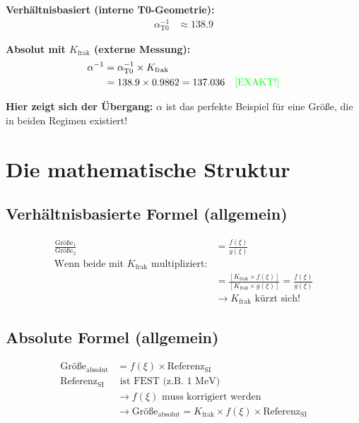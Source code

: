 \documentclass[12pt,a4paper]{article}
\begin{document}
	\textbf{Verhältnisbasiert (interne T0-Geometrie):}
	\begin{align*}
		\alpha_{\text{T0}}^{-1} &\approx 138.9
	\end{align*}
	
	\textbf{Absolut mit $K_{\text{frak}}$ (externe Messung):}
	\begin{align*}
		\alpha^{-1} &= \alpha_{\text{T0}}^{-1} \times K_{\text{frak}} \\
		&= 138.9 \times 0.9862 = 137.036 \quad \text{\textcolor{green}{[EXAKT!]}}
	\end{align*}
	
	\textbf{Hier zeigt sich der Übergang:} $\alpha$ ist das perfekte Beispiel für eine Größe, die in beiden Regimen existiert!
	
	\section{Die mathematische Struktur}
	
	\subsection{Verhältnisbasierte Formel (allgemein)}
	\begin{align*}
		\frac{\text{Größe}_1}{\text{Größe}_2} &= \frac{f(\xi)}{g(\xi)} \\
		\text{Wenn beide mit $K_{\text{frak}}$ multipliziert:} & \\
		&= \frac{[K_{\text{frak}} \times f(\xi)]}{[K_{\text{frak}} \times g(\xi)]} = \frac{f(\xi)}{g(\xi)} \\
		&\rightarrow K_{\text{frak}} \text{ kürzt sich!}
	\end{align*}
	
	\subsection{Absolute Formel (allgemein)}
	\begin{align*}
		\text{Größe}_{\text{absolut}} &= f(\xi) \times \text{Referenz}_{\text{SI}} \\
		\text{Referenz}_{\text{SI}} &\text{ ist FEST (z.B. 1 MeV)} \\
		&\rightarrow f(\xi) \text{ muss korrigiert werden} \\
		&\rightarrow \text{Größe}_{\text{absolut}} = K_{\text{frak}} \times f(\xi) \times \text{Referenz}_{\text{SI}}
	\end{align*}
	
\end{document}
